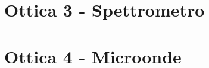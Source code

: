 \documentclass[11pt]{article}
\begin{document}
\newpage



\section{ Ottica 3 - Spettrometro}









\newpage




\section{ Ottica 4 - Microonde}





\newpage
\end{document}

